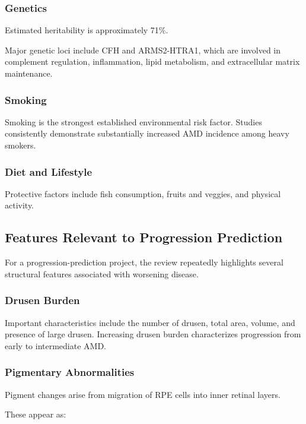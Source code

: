 \documentclass[11pt]{article}
\begin{document}
\subsubsection*{Genetics}

Estimated heritability is approximately 71\%. 

Major genetic loci include CFH and ARMS2-HTRA1, which are involved in complement regulation, inflammation, lipid metabolism, and extracellular matrix maintenance.

\subsubsection*{Smoking}

Smoking is the strongest established environmental risk factor.
Studies consistently demonstrate substantially increased AMD incidence among heavy smokers.

\subsubsection*{Diet and Lifestyle}

Protective factors include fish consumption, fruits and veggies, and physical activity.

\subsection*{Features Relevant to Progression Prediction}

For a progression-prediction project, the review repeatedly highlights several structural features associated with worsening disease.

\subsubsection*{Drusen Burden}

Important characteristics include the number of drusen, total area, volume, and presence of large drusen. Increasing drusen burden characterizes progression from early to intermediate AMD.

\subsubsection*{Pigmentary Abnormalities}

Pigment changes arise from migration of RPE cells into inner retinal layers.

These appear as:
\end{document}
